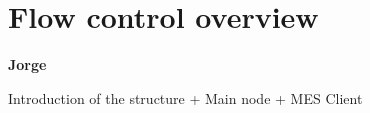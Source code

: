 \section{Flow control overview} %
\label{sec:mr_flow_control_overview}

\textbf{Jorge}

Introduction of the structure + Main node + MES Client

